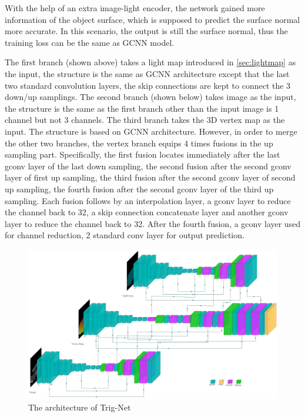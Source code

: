 \documentclass[border=15pt, multi, tikz]{article}
\begin{document}
With the help of an extra image-light encoder, the network gained more information of the object surface, which is supposed to predict the surface normal more accurate. In this scenario, the output is still the surface normal, thus the training loss can be the same as GCNN model.




The first branch (shown above) takes a light map introduced in \ref{sec:lightmap} as the input, the structure is the same as GCNN architecture except that the last two standard convolution layers, the skip connections are kept to connect the 3 down/up samplings. 
The second branch (shown below) takes image as the input, the structure is the same as the first branch other than the input image is 1 channel but not 3 channels. 
The third branch takes the 3D vertex map as the input. The structure is based on GCNN architecture. However, in order to merge the other two branches, the vertex branch equips 4 times fusions in the up sampling part. Specifically, the first fusion locates immediately after the last gconv layer of the last down sampling, the second fusion after the second gconv layer of first up sampling, the third fusion after the second gconv layer of second up sampling, the fourth fusion after the second gconv layer of the third up sampling. Each fusion follows by an interpolation layer, a gconv layer to reduce the channel back to 32, a skip connection concatenate layer and another gconv layer to reduce the channel back to 32. After the fourth fusion, a gconv layer used for channel reduction, 2 standard conv layer for output prediction.



\begin{figure}
	\centering
	\includegraphics[width=1\textwidth]{Figures/trignet} %
	\caption{The architecture of Trig-Net}
	\label{fig:VIL-Net}
\end{figure}
\end{document}
